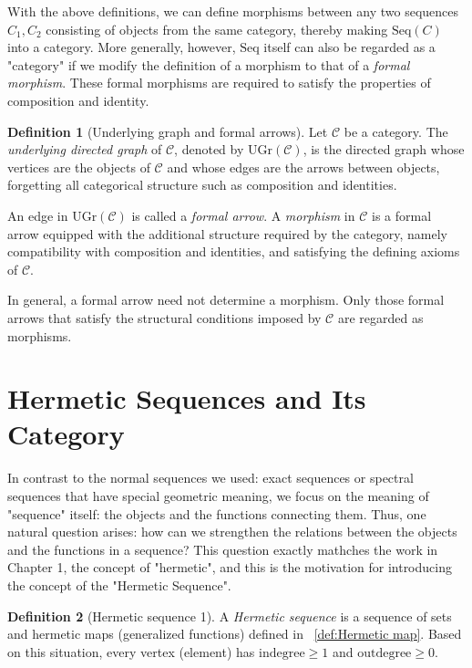 \documentclass[11pt]{book}
\theoremstyle{definition}
\newtheorem{definition}{Definition}[section]
\theoremstyle{plain}
\theoremstyle{remark}
\begin{document}
With the above definitions, we can define morphisms between any two sequences 
\(C_1, C_2\) consisting of objects from the same category, thereby making 
\(\mathrm{Seq}(C)\) into a category. More generally, however, \(\mathrm{Seq}\) 
itself can also be regarded as a "category" if we modify the definition of a morphism 
to that of a \emph{formal morphism}. These formal morphisms are required to satisfy 
the properties of composition and identity. 

\begin{definition}[Underlying graph and formal arrows]\label{def:formal-arrow}
Let $\mathcal{C}$ be a category.
The \emph{underlying directed graph} of $\mathcal{C}$, denoted by
$\mathrm{UGr}(\mathcal{C})$, is the directed graph whose vertices are the
objects of $\mathcal{C}$ and whose edges are the arrows between objects,
forgetting all categorical structure such as composition and identities.

An edge in $\mathrm{UGr}(\mathcal{C})$ is called a \emph{formal arrow}.
A \emph{morphism} in $\mathcal{C}$ is a formal arrow equipped with the
additional structure required by the category, namely compatibility with
composition and identities, and satisfying the defining axioms of
$\mathcal{C}$.

In general, a formal arrow need not determine a morphism.
Only those formal arrows that satisfy the structural conditions imposed by
$\mathcal{C}$ are regarded as morphisms.
\end{definition}

\section{Hermetic Sequences and Its Category}
In contrast to the normal sequences we used: exact sequences or spectral sequences that have 
special geometric meaning, we focus on the meaning of "sequence" itself: the objects and the 
functions connecting them.
Thus, one natural question arises: how can we strengthen the relations between the objects 
and the functions in a sequence? This question exactly mathches the work in Chapter 1, the concept
of "hermetic", and this is the motivation for introducing the concept of the "Hermetic Sequence". 

\begin{definition}[Hermetic sequence 1]
A \emph{Hermetic sequence} is a sequence of sets and hermetic maps (generalized functions) defined in 
~\ref{def:Hermetic map}. Based on this situation, every vertex (element) has $\text{indegree} \ge 1$ and
$\text{outdegree} \ge 0$.
\end{definition}
\end{document}
